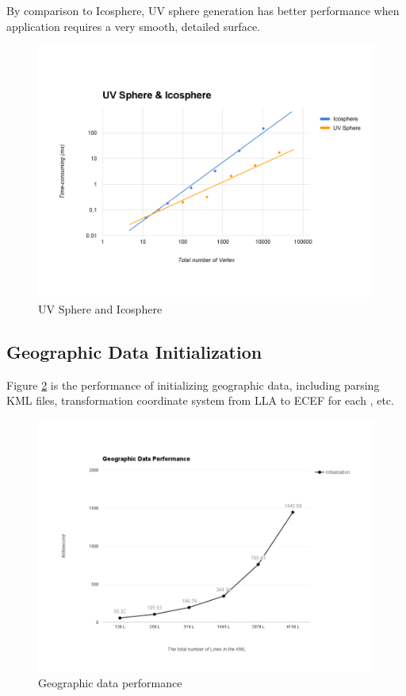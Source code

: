 By comparison to Icosphere, UV sphere generation has better performance when application requires a very smooth, detailed surface.

\begin{figure}[H]
	\caption{UV Sphere and Icosphere}
	\label{fig:uv-sphere-and-icosphere}
	\centering
	\includegraphics[width=\textwidth, keepaspectratio]{Figures/uv-sphere-and-icosphere.png}
	\decoRule
\end{figure}

\subsection{Geographic Data Initialization}

Figure \ref{fig:geographic-data-performance} is the performance of initializing geographic data, including parsing KML files, transformation coordinate system from LLA to ECEF for each , etc.

\begin{figure}[H]
	\caption{Geographic data performance}
	\label{fig:geographic-data-performance}
	\centering
	\includegraphics[width=\textwidth, keepaspectratio]{Figures/geographic-data-performance.png}
	\decoRule
\end{figure}

